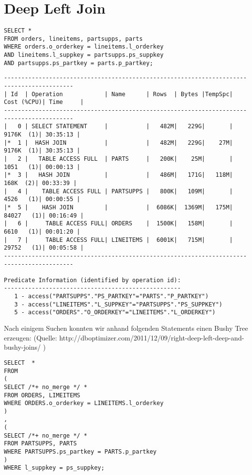 \documentclass[10pt]{article}
\begin{document}
\section{Deep Left Join}
\begin{lstlisting}[style=sql]
SELECT *
FROM orders, lineitems, partsupps, parts
WHERE orders.o_orderkey = lineitems.l_orderkey
AND lineitems.l_suppkey = partsupps.ps_suppkey
AND partsupps.ps_partkey = parts.p_partkey;
\end{lstlisting}
\begin{lstlisting}[style=queryexecutionplan]
------------------------------------------------------------------------------------------
| Id  | Operation            | Name      | Rows  | Bytes |TempSpc| Cost (%CPU)| Time     |
------------------------------------------------------------------------------------------
|   0 | SELECT STATEMENT     |           |   482M|   229G|       |  9176K  (1)| 30:35:13 |
|*  1 |  HASH JOIN           |           |   482M|   229G|    27M|  9176K  (1)| 30:35:13 |
|   2 |   TABLE ACCESS FULL  | PARTS     |   200K|    25M|       |  1051   (1)| 00:00:13 |
|*  3 |   HASH JOIN          |           |   486M|   171G|   118M|   168K  (2)| 00:33:39 |
|   4 |    TABLE ACCESS FULL | PARTSUPPS |   800K|   109M|       |  4526   (1)| 00:00:55 |
|*  5 |    HASH JOIN         |           |  6086K|  1369M|   175M| 84027   (1)| 00:16:49 |
|   6 |     TABLE ACCESS FULL| ORDERS    |  1500K|   158M|       |  6610   (1)| 00:01:20 |
|   7 |     TABLE ACCESS FULL| LINEITEMS |  6001K|   715M|       | 29752   (1)| 00:05:58 |
------------------------------------------------------------------------------------------

Predicate Information (identified by operation id):
---------------------------------------------------
   1 - access("PARTSUPPS"."PS_PARTKEY"="PARTS"."P_PARTKEY")
   3 - access("LINEITEMS"."L_SUPPKEY"="PARTSUPPS"."PS_SUPPKEY")
   5 - access("ORDERS"."O_ORDERKEY"="LINEITEMS"."L_ORDERKEY")
\end{lstlisting}
\newpage
Nach einigem Suchen konnten wir anhand folgenden Statements einen Bushy Tree erzeugen:
\newline(Quelle: http://dboptimizer.com/2011/12/09/right-deep-left-deep-and-bushy-joins/ )
\begin{lstlisting}[style=sql]
SELECT  *
FROM 
(
SELECT /*+ no_merge */ *
FROM ORDERS, LIMEITEMS
WHERE ORDERS.o_orderkey = LINEITEMS.l_orderkey
)
,
(
SELECT /*+ no_merge */ *
FROM PARTSUPPS, PARTS
WHERE PARTSUPPS.ps_partkey = PARTS.p_partkey
)
WHERE l_suppkey = ps_suppkey;
\end{lstlisting}
\end{document}
